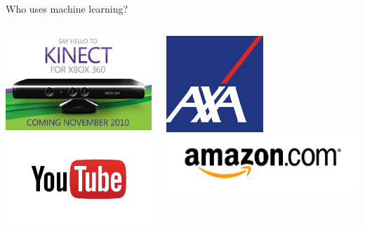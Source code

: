 \documentclass[pdf]{beamer}
\begin{document}
\begin{frame}{Who uses machine learning?}
\begin{columns}
\begin{center}
	\includegraphics[width=\textwidth]{kinect.jpg}\\
	\includegraphics[width=\textwidth]{youtube.png}
\end{center}
\begin{center}
	\includegraphics[width=0.5\textwidth]{AXA.png}\\
	\vspace{2cm}
	\includegraphics[width=\textwidth]{amazon.jpg}
\end{center}
\end{columns}
\end{frame}
\end{document}
